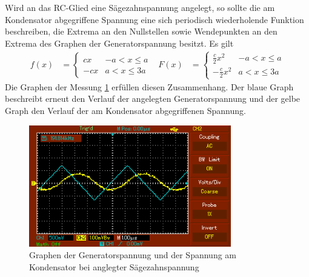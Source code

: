Wird an das RC-Glied eine Sägezahnspannung angelegt, so sollte die am Kondensator
abgegriffene Spannung eine sich periodisch wiederholende Funktion beschreiben, die
Extrema an den Nullstellen sowie Wendepunkten an den Extrema des Graphen der
Generatorspannung besitzt. Es gilt
\begin{align}
  f(x)&=
  \begin{cases}
    c x & -a<x\leq a\\
    -c x & a<x\leq 3a
  \end{cases}
  & F(x)&=
  \begin{cases}
    \frac{c}{2} x^2 & -a<x\leq a\\
    -\frac{c}{2} x^2 & a<x\leq 3a
  \end{cases}
\end{align}
Die Graphen der Messung \ref{fig:saegezahn} erfüllen diesen Zusammenhang.
Der blaue Graph beschreibt erneut den Verlauf der angelegten Generatorspannung und
der gelbe Graph den Verlauf der am Kondensator abgegriffenen Spannung.
\begin{figure}
  \centering
  \includegraphics[width=250pt]{data/integration_saegezahn.PNG}
  \caption{Graphen der Generatorspannung und der Spannung am Kondensator bei anglegter
  Sägezahnspannung}
  \label{fig:saegezahn}
\end{figure}



